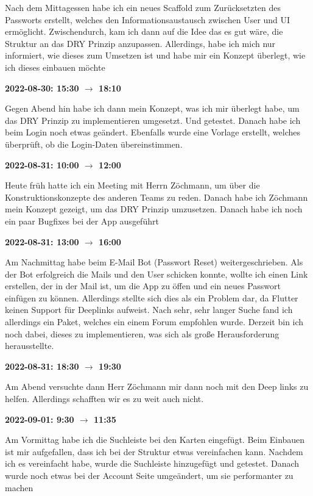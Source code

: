 Nach dem Mittagessen habe ich ein neues Scaffold zum Zurücksetzten des
Passworts erstellt, welches den Informationsaustausch zwischen User und
UI ermöglicht. Zwischendurch, kam ich dann auf die Idee das es gut wäre,
die Struktur an das DRY Prinzip anzupassen. Allerdings, habe ich mich nur
informiert, wie dieses zum Umsetzen ist und habe mir ein Konzept
überlegt, wie ich dieses einbauen möchte

\vspace{0.5cm} \textbf{2022-08-30: 15:30 $\rightarrow$ 18:10}

Gegen Abend hin habe ich dann mein Konzept, was ich mir überlegt habe, um
das DRY Prinzip zu implementieren umgesetzt. Und getestet. Danach habe
ich beim Login noch etwas geändert. Ebenfalls wurde eine Vorlage erstellt, welches
überprüft, ob die Login-Daten übereinstimmen.

\vspace{0.5cm} \textbf{2022-08-31: 10:00 $\rightarrow$ 12:00}

Heute früh hatte ich ein Meeting mit Herrn Zöchmann, um über
die Konstruktionskonzepte des anderen Teams zu reden. Danach habe ich
Zöchmann mein Konzept gezeigt, um das DRY Prinzip umzusetzen. Danach
habe ich noch ein paar Bugfixes bei der App ausgeführt

\vspace{0.5cm} \textbf{2022-08-31: 13:00 $\rightarrow$ 16:00}

Am Nachmittag habe beim E-Mail Bot (Passwort Reset) weitergeschrieben.
Als der Bot erfolgreich die Mails und den User schicken konnte, wollte
ich einen Link erstellen, der in der Mail ist, um die App zu \"offen und
ein neues Passwort einfügen zu können. Allerdings stellte sich dies
als ein Problem dar, da Flutter keinen Support f\"ur Deeplinks aufweist.
Nach sehr, sehr langer Suche fand ich allerdings ein Paket, welches ein
einem Forum empfohlen wurde. Derzeit bin ich noch dabei, dieses zu
implementieren, was sich als große Herausforderung herausstellte.

\vspace{0.5cm} \textbf{2022-08-31: 18:30 $\rightarrow$ 19:30}

Am Abend versuchte dann Herr Zöchmann mir dann noch mit den Deep links
zu helfen. Allerdings schafften wir es zu weit auch nicht.

\vspace{0.5cm} \textbf{2022-09-01: 9:30 $\rightarrow$ 11:35}

Am Vormittag habe ich die Suchleiste bei den Karten eingefügt. Beim
Einbauen ist mir aufgefallen, dass ich bei der Struktur etwas
vereinfachen kann. Nachdem ich es vereinfacht habe, wurde die Suchleiste
hinzugefügt und getestet. Danach wurde noch etwas bei der Account Seite
umgeändert, um sie performanter zu machen

